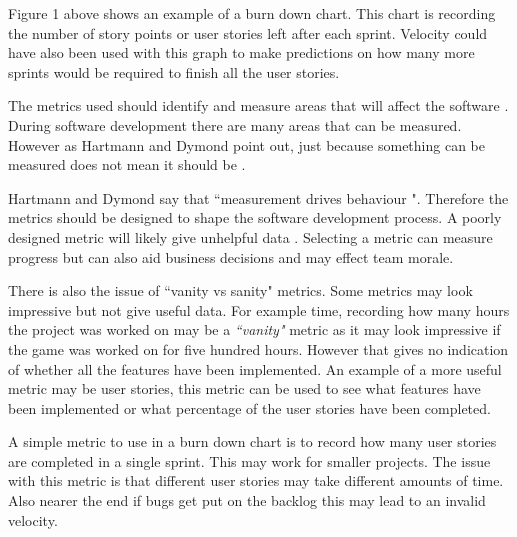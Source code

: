 \documentclass{scrartcl}
\begin{document}
Figure 1 above shows an example of a burn down chart. This chart is recording the number of story points or user stories left after each sprint. Velocity could have also been used with this graph to make predictions on how many more sprints would be required to finish all the user stories.

The metrics used should identify and measure areas that will affect the software \cite{Misra}.
During software development there are many areas that can be measured. However as Hartmann and Dymond point out, just because something can be measured does not mean it should be \cite{Hartmann}.

Hartmann and Dymond say that ``measurement drives behaviour "\cite{Hartmann}.  %
Therefore the metrics should be designed to shape the software development process. A poorly designed metric will likely give unhelpful data \cite{Ktata}.  Selecting a metric can measure progress but can also aid business decisions and may effect team morale. %

There is also the issue of ``vanity vs sanity" metrics. Some metrics may look impressive but not give useful data. For example time, recording how many hours the project was worked on may be a \textit{``vanity"} metric as it may look impressive if the game was worked on for five hundred hours. However that gives no indication of whether all the features have been implemented. An example of a more useful metric may be user stories, this metric can be used to see what features have been implemented or what percentage of the user stories have been completed.





A simple metric to use in a burn down chart is to record how many user stories are completed in a single sprint. This may work for smaller projects. The issue with this metric is that different user stories may take different amounts of time. Also nearer the end if bugs get put on the backlog this may lead to an invalid velocity. %

\end{document}
